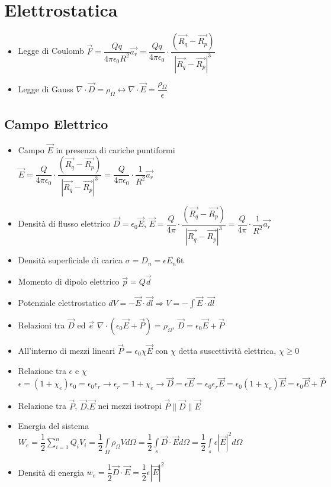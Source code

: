 \documentclass{article}
\begin{document}
\newpage

\section{Elettrostatica}
\begin{itemize}
	\item Legge di Coulomb \( \vec{F} = \dfrac{Qq}{4 \pi \epsilon_0 R^2} \vec{a_r} = \dfrac{Qq}{4 \pi \epsilon_0} \cdot \dfrac{(\vec{R_q} - \vec{R_p})}{| \vec{R_q} - \vec{R_p} | ^3 } \)
	\item Legge di Gauss \( \nabla \cdot \vec{D} = \rho_\Omega \leftrightarrow \nabla \cdot \vec{E} = \dfrac{\rho_\Omega}{\epsilon} \)
\end{itemize}

\subsection{Campo Elettrico}
\begin{itemize}
	\item Campo \(\vec{E}\) in presenza di cariche puntiformi \( \vec{E} = \dfrac{Q}{4 \pi \epsilon_0} \cdot \dfrac{(\vec{R_q} - \vec{R_p})}{| \vec{R_q} - \vec{R_p} | ^3 } = \dfrac{Q}{4 \pi \epsilon_0} \cdot \dfrac{1}{R^2} \vec{a_r} \)
	\item Densità di flusso elettrico \( \vec{D} = \epsilon_0 \vec{E} \),  \( \vec{E} = \dfrac{Q}{4 \pi} \cdot \dfrac{(\vec{R_q} - \vec{R_p})}{| \vec{R_q} - \vec{R_p} | ^3 } = \dfrac{Q}{4 \pi} \cdot \dfrac{1}{R^2} \vec{a_r} \)
	\item Densità superficiale di carica \( \sigma = D_n = \epsilon E_n \)6t
	\item Momento di dipolo elettrico \( \vec{p} = Q \vec{d} \)
	\item Potenziale elettrostatico \(\displaystyle dV = -\vec{E} \cdot \vec{dl} \Rightarrow V = -\int{\vec{E} \cdot \vec{dl}} \)
	\item Relazioni tra \(\vec{D}\) ed \(\vec{e}\) \( \nabla \cdot (\epsilon_0 \vec{E} + \vec{P} ) = \rho_\Omega \), \( \vec{D} = \epsilon_0 \vec{E} + \vec{P} \)
	\item All'interno di mezzi lineari \(\vec{P} = \epsilon_0 \chi \vec{E} \) con \(\chi\) detta suscettività elettrica, \(\chi \geq  0\)
	\item Relazione tra \(\epsilon\) e \(\chi\) \(\epsilon = (1 + \chi_e) \epsilon_0 = \epsilon_0 \epsilon_r \rightarrow \epsilon_r = 1 + \chi_e \rightarrow \vec{D} = \epsilon \vec{E} = \epsilon_0 \epsilon_r \vec{E} = \epsilon_0 (1 + \chi_e) \vec{E} = \epsilon_0 \vec{E} + \vec{P} \)
	\item Relazione tra \(\vec{P}\), \(\vec{D}\),\(\vec{E}\) nei mezzi isotropi \(\vec{P}\|\vec{D}\|\vec{E}\)
	\item Energia del sistema \(\displaystyle W_e = \dfrac{1}{2} \sum\limits_{i=1}^{n}Q_iV_i = \dfrac{1}{2} \int\limits_\Omega \rho_\Omega V d\Omega = \dfrac{1}{2} \int\limits_{s} \vec{D} \cdot \vec{E} d\Omega = \dfrac{1}{2} \int\limits_{s} \epsilon |\vec{E}|^2 d\Omega \)
	\item Densità di energia \( w_e = \dfrac{1}{2} \vec{D} \cdot \vec{E} = \dfrac{1}{2} \epsilon |\vec{E}|^2 \)
\end{itemize}
\end{document}
